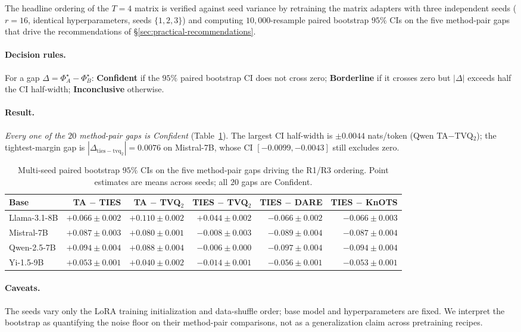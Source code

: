 \label{subsec:exp-multiseed-bootstrap}
The headline ordering of the $T = 4$ matrix is verified against seed
variance by retraining the matrix adapters with three independent
seeds ($r = 16$, identical hyperparameters, seeds $\{1, 2, 3\}$) and
computing $10{,}000$-resample paired bootstrap $95\%$ CIs on the five
method-pair gaps that drive the recommendations of
\S\ref{sec:practical-recommendations}.

\paragraph{Decision rules.} For a gap $\Delta = \Phi^\star_A -
\Phi^\star_B$: \textbf{Confident} if the $95\%$ paired bootstrap CI
does not cross zero; \textbf{Borderline} if it crosses zero but
$|\Delta|$ exceeds half the CI half-width; \textbf{Inconclusive}
otherwise.

\paragraph{Result.} \emph{Every one of the $20$ method-pair gaps is
Confident} (Table~\ref{tab:multiseed-bootstrap}). The largest CI
half-width is $\pm 0.0044$ nats/token (Qwen TA$-$TVQ$_2$); the
tightest-margin gap is $|\Delta_{\mathrm{ties-tvq_2}}| = 0.0076$ on
Mistral-7B, whose CI $[-0.0099, -0.0043]$ still excludes zero.

\begin{table}[h]
\centering
\caption{Multi-seed paired bootstrap $95\%$ CIs on the five
method-pair gaps driving the R1/R3 ordering. Point estimates are means
across seeds; all $20$ gaps are Confident.}
\label{tab:multiseed-bootstrap}
\footnotesize
\setlength{\tabcolsep}{2pt}
\begin{tabular}{lrrrrr}
\hline
Base & TA $-$ TIES & TA $-$ TVQ$_2$ & TIES $-$ TVQ$_2$ & TIES $-$ DARE & TIES $-$ KnOTS \\
\hline
Llama-3.1-8B & $+0.066 \pm 0.002$ & $+0.110 \pm 0.002$ & $+0.044 \pm 0.002$ & $-0.066 \pm 0.002$ & $-0.066 \pm 0.003$ \\
Mistral-7B   & $+0.087 \pm 0.003$ & $+0.080 \pm 0.001$ & $-0.008 \pm 0.003$ & $-0.089 \pm 0.004$ & $-0.087 \pm 0.004$ \\
Qwen-2.5-7B  & $+0.094 \pm 0.004$ & $+0.088 \pm 0.004$ & $-0.006 \pm 0.000$ & $-0.097 \pm 0.004$ & $-0.094 \pm 0.004$ \\
Yi-1.5-9B    & $+0.053 \pm 0.001$ & $+0.040 \pm 0.002$ & $-0.014 \pm 0.001$ & $-0.056 \pm 0.001$ & $-0.053 \pm 0.001$ \\
\hline
\end{tabular}
\end{table}

\paragraph{Caveats.} The seeds vary only the LoRA training
initialization and data-shuffle order; base model and hyperparameters
are fixed. We interpret the bootstrap as quantifying the noise floor
on their method-pair comparisons, not as a generalization claim across
pretraining recipes.
